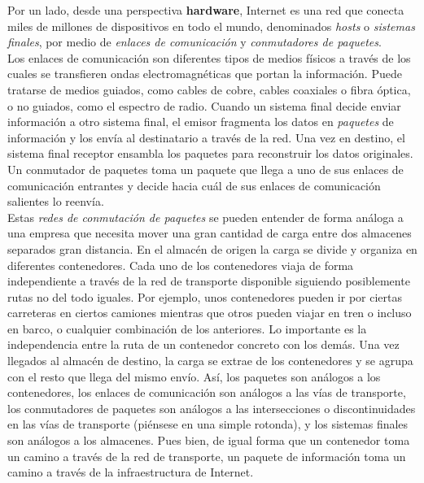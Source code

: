 \documentclass[a4paper]{report}
\begin{document}
    Por un lado, desde una perspectiva \textbf{hardware}, Internet es una red que conecta miles de millones de dispositivos en todo el mundo, denominados \emph{hosts} o \emph{sistemas finales}, por medio de \emph{enlaces de comunicación} y \emph{conmutadores de paquetes}.
    \\
    
    Los enlaces de comunicación son diferentes tipos de medios físicos a través de los cuales se transfieren ondas electromagnéticas que portan la información. Puede tratarse de medios guiados, como cables de cobre, cables coaxiales o fibra óptica, o no guiados, como el espectro de radio. Cuando un sistema final decide enviar información a otro sistema final, el emisor fragmenta los datos en \emph{paquetes} de información y los envía al destinatario a través de la red. Una vez en destino, el sistema final receptor ensambla los paquetes para reconstruir los datos originales. Un conmutador de paquetes toma un paquete que llega a uno de sus enlaces de comunicación entrantes y decide hacia cuál de sus enlaces de comunicación salientes lo reenvía.
    \\

    Estas \emph{redes de conmutación de paquetes} se pueden entender de forma análoga a una empresa que necesita mover una gran cantidad de carga entre dos almacenes separados gran distancia. En el almacén de origen la carga se divide y organiza en diferentes contenedores. Cada uno de los contenedores viaja de forma independiente a través de la red de transporte disponible siguiendo posiblemente rutas no del todo iguales. Por ejemplo, unos contenedores pueden ir por ciertas carreteras en ciertos camiones mientras que otros pueden viajar en tren o incluso en barco, o cualquier combinación de los anteriores. Lo importante es la independencia entre la ruta de un contenedor concreto con los demás. Una vez llegados al almacén de destino, la carga se extrae de los contenedores y se agrupa con el resto que llega del mismo envío. Así, los paquetes son análogos a los contenedores, los enlaces de comunicación son análogos a las vías de transporte, los conmutadores de paquetes son análogos a las intersecciones o discontinuidades en las vías de transporte (piénsese en una simple rotonda), y los sistemas finales son análogos a los almacenes. Pues bien, de igual forma que un contenedor toma un camino a través de la red de transporte, un paquete de información toma un camino a través de la infraestructura de Internet.
    \\
\end{document}
